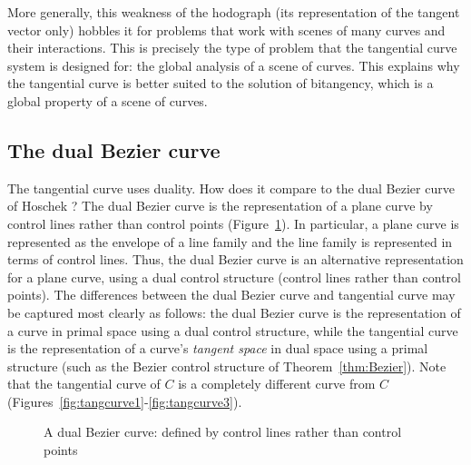 \documentclass[12pt]{article}
\begin{document}
More generally, this weakness of the hodograph (its representation of the tangent
vector only) hobbles it
for problems that work with scenes of many curves and their interactions.
This is precisely the type of problem 
that the tangential curve system is designed for:
the global analysis of a scene of curves.
This explains why the tangential curve is better suited to the solution of bitangency,
which is a global property of a scene of curves.


\subsection{The dual Bezier curve}
\label{sec:dualBezier}

The tangential curve uses duality.
How does it compare to the dual Bezier curve of Hoschek \cite{hoschek83}?
The dual Bezier curve is the representation of a plane curve by control lines
rather than control points (Figure~\ref{fig:Hoschekdual}).
In particular, a plane curve is represented as the envelope of a line family
and the line family is represented in terms of control lines.
Thus, the dual Bezier curve is an alternative representation for a plane curve,
using a dual control structure (control lines rather than control points).
The differences between the dual Bezier curve
and tangential curve may be captured most clearly as follows:
the dual Bezier curve is the representation of a curve in primal space
using a dual control structure,
while the tangential curve is the representation of a curve's {\em tangent space}
in dual space using a primal structure (such as the Bezier control structure
of Theorem~\ref{thm:Bezier}).
Note that the tangential curve of $C$ is a completely different curve from $C$
(Figures~\ref{fig:tangcurve1}-\ref{fig:tangcurve3}).


\begin{figure}
\centerline{}
\caption{A dual Bezier curve: defined by control lines rather than control points}
\label{fig:Hoschekdual}
\end{figure}
\end{document}
